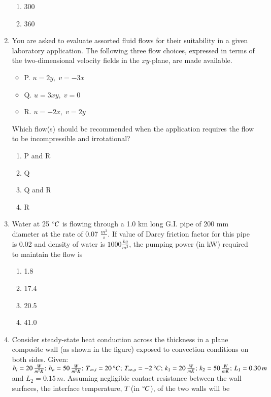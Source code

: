 \documentclass[journal]{IEEEtran}
\begin{document}
\begin{enumerate}
\begin{enumerate}
    \item  300
    \item  360
  \end{enumerate}
  \item You are asked to evaluate assorted fluid flows for their suitability in a given laboratory application. The following three flow choices, expressed in terms of the two-dimensional velocity fields in the $xy$-plane, are made available.
\begin{itemize}
    \item P. $u = 2y, \; v = -3x$
    \item Q. $u = 3xy, \; v = 0$
    \item R. $u = -2x, \; v = 2y$
\end{itemize}
Which flow(s) should be recommended when the application requires the flow to be incompressible and irrotational?
\begin{enumerate}
    \item  P and R
    \item  Q
    \item  Q and R
    \item  R
  \end{enumerate}
\item Water at 25 $\degree C$ is flowing through a 1.0 km long G.I. pipe of 200 mm diameter at the rate of 0.07 $\frac{m^3}{s}$. If value of Darcy friction factor for this pipe is 0.02 and density of water is $1000 \frac{kg}{m^3}$, the pumping power (in kW) required to maintain the flow is
\begin{enumerate}
    \item  1.8
    \item  17.4
    \item  20.5
    \item  41.0
  \end{enumerate}
  \item Consider steady-state heat conduction across the thickness in a plane composite wall (as shown in the figure) exposed to convection conditions on both sides.
Given: $h_i = 20 \, \frac{W}{m^2K}; \, h_o = 50 \, \frac{W}{m^2K}; \, T_{\infty,i} = 20 \,\degree C; \, T_{\infty,o} = -2 \,\degree C; \, k_1 = 20 \, \frac{W}{mK}; \, k_2 = 50 \, \frac{W}{mK}; \, L_1 = 0.30 \, m$ and $L_2 = 0.15 \, m$. 
Assuming negligible contact resistance between the wall surfaces, the interface temperature, $T$ (in $\degree C$), of the two walls will be
 \begin{figure}[!ht]
    \centering

\end{figure}
\end{enumerate}
\end{document}
